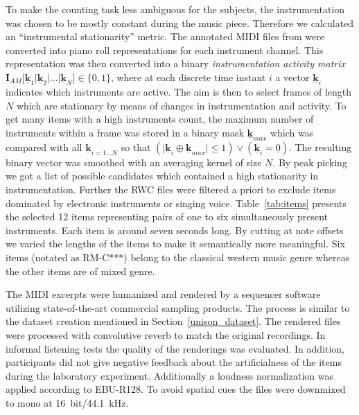 To make the counting task less ambiguous for the subjects, the instrumentation was chosen to be mostly constant during the music piece.
Therefore we calculated an ``instrumental stationarity'' metric.
The annotated MIDI files from \cite{rwc} were converted into piano roll representations for each instrument channel. This representation was then converted into a binary \emph{instrumentation activity matrix} $\mathbf{I}_{AM}\lbrack \mathbf{\underline{k}}_1 \vert \mathbf{\underline{k}}_2 \vert  ... \vert \mathbf{\underline{k}}_N \rbrack \in \{0,1\}$, where at each discrete time instant $i$ a vector $\mathbf{\underline{k}}_i$ indicates which instruments are active. The aim is then to select frames of length $N$ which are stationary by means of changes in instrumentation and activity. To get many items with a high instruments count, the maximum number of instruments within a frame was stored in a binary mask $\mathbf{\underline{k}}_{max}$ which was compared with all $\mathbf{\underline{k}}_{i=1...N}$ so that $(\vert\mathbf{\underline{k}}_{i} \oplus \mathbf{\underline{k}}_{max}\vert \leq 1) \lor (\mathbf{\underline{k}}_{i} = \underline{0})$. The resulting binary vector was smoothed with an averaging kernel of size $N$. By peak picking we got a list of possible candidates which contained a high stationarity in instrumentation.
Further the RWC files were filtered a priori to exclude items dominated by electronic instruments or singing voice. Table~\ref{tab:items} presents the selected 12 items representing pairs of one to six simultaneously present instruments. Each item is around seven seconds long. By cutting at note offsets we varied the lengths of the items to make it semantically more meaningful. Six items (notated as RM-C***) belong to the classical western music genre whereas the other items are of mixed genre.
\par
The MIDI excerpts were humanized and rendered by a sequencer software utilizing state-of-the-art commercial sampling products.
The process is similar to the dataset creation mentioned in Section~\ref{unison_dataset}.
The rendered files were processed with convolutive reverb to match the original recordings. 
In informal listening tests the quality of the renderings was evaluated. 
In addition, participants did not give negative feedback about the artificialness of the items during the laboratory experiment. Additionally a loudness normalization was applied according to EBU-R128\cite{EBU2011}. To avoid spatial cues the files were downmixed to mono at 16~bit/44.1~kHz.

